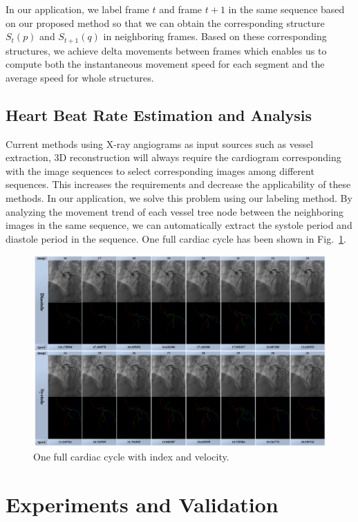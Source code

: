 \documentclass[journal]{IEEEtran}
\begin{document}
In our application, we label frame $t$ and frame $t+1$ in the same sequence based on our proposed method so that we can obtain the corresponding structure $S_{t}(p)$ and $S_{t+1}(q)$ in neighboring frames. Based on these corresponding structures, we achieve delta movements between frames which enables us to compute both the instantaneous movement speed for each segment and the average speed for whole structures.

\subsection{Heart Beat Rate Estimation and Analysis}
Current methods using X-ray angiograms as input sources such as vessel extraction, 3D reconstruction will always require the cardiogram corresponding with the image sequences to select corresponding images among different sequences. This increases the requirements and decrease the applicability of these methods. In our application, we solve this problem using our labeling method. By analyzing the movement trend of each vessel tree node between the neighboring images in the same sequence, we can automatically extract the systole period and diastole period in the sequence. One full cardiac cycle has been shown in Fig.~\ref{fig:app_cardiac_cycle}.

\begin{figure}[!t]
\centering
\includegraphics[width=1.0\linewidth]{./images/cardiac_cycle.png}
\caption{One full cardiac cycle with index and velocity.}
\label{fig:app_cardiac_cycle}
\end{figure}

\section{Experiments and Validation}
\end{document}
